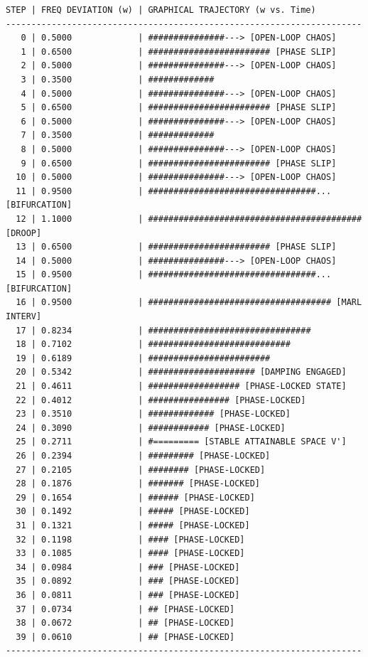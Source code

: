 \documentclass[11pt,fleqn]{article}
\begin{document}
\begin{verbatim}
STEP | FREQ DEVIATION (w) | GRAPHICAL TRAJECTORY (w vs. Time)
----------------------------------------------------------------------
   0 | 0.5000             | ###############---> [OPEN-LOOP CHAOS]
   1 | 0.6500             | ######################## [PHASE SLIP]
   2 | 0.5000             | ###############---> [OPEN-LOOP CHAOS]
   3 | 0.3500             | #############
   4 | 0.5000             | ###############---> [OPEN-LOOP CHAOS]
   5 | 0.6500             | ######################## [PHASE SLIP]
   6 | 0.5000             | ###############---> [OPEN-LOOP CHAOS]
   7 | 0.3500             | #############
   8 | 0.5000             | ###############---> [OPEN-LOOP CHAOS]
   9 | 0.6500             | ######################## [PHASE SLIP]
  10 | 0.5000             | ###############---> [OPEN-LOOP CHAOS]
  11 | 0.9500             | #################################... [BIFURCATION]
  12 | 1.1000             | ########################################## [DROOP]
  13 | 0.6500             | ######################## [PHASE SLIP]
  14 | 0.5000             | ###############---> [OPEN-LOOP CHAOS]
  15 | 0.9500             | #################################... [BIFURCATION]
  16 | 0.9500             | #################################### [MARL INTERV]
  17 | 0.8234             | ################################
  18 | 0.7102             | ############################
  19 | 0.6189             | ########################
  20 | 0.5342             | ##################### [DAMPING ENGAGED]
  21 | 0.4611             | ################## [PHASE-LOCKED STATE]
  22 | 0.4012             | ################ [PHASE-LOCKED]
  23 | 0.3510             | ############# [PHASE-LOCKED]
  24 | 0.3090             | ############ [PHASE-LOCKED]
  25 | 0.2711             | #========= [STABLE ATTAINABLE SPACE V']
  26 | 0.2394             | ######### [PHASE-LOCKED]
  27 | 0.2105             | ######## [PHASE-LOCKED]
  28 | 0.1876             | ####### [PHASE-LOCKED]
  29 | 0.1654             | ###### [PHASE-LOCKED]
  30 | 0.1492             | ##### [PHASE-LOCKED]
  31 | 0.1321             | ##### [PHASE-LOCKED]
  32 | 0.1198             | #### [PHASE-LOCKED]
  33 | 0.1085             | #### [PHASE-LOCKED]
  34 | 0.0984             | ### [PHASE-LOCKED]
  35 | 0.0892             | ### [PHASE-LOCKED]
  36 | 0.0811             | ### [PHASE-LOCKED]
  37 | 0.0734             | ## [PHASE-LOCKED]
  38 | 0.0672             | ## [PHASE-LOCKED]
  39 | 0.0610             | ## [PHASE-LOCKED]
----------------------------------------------------------------------
\end{verbatim}
\end{document}
